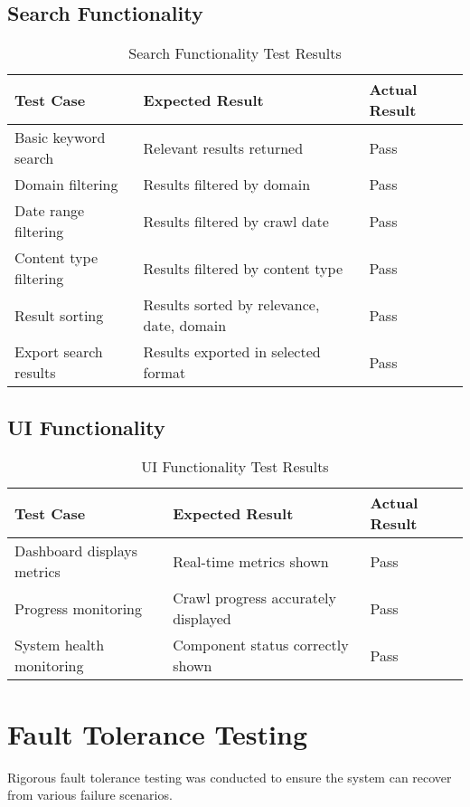 \documentclass[12pt,a4paper]{report}
\begin{document}
\subsection{Search Functionality}
\begin{table}[H]
    \centering
    \begin{tabularx}{\textwidth}{|X|X|X|}
        \hline
        \textbf{Test Case} & \textbf{Expected Result} & \textbf{Actual Result} \\
        \hline
        Basic keyword search & Relevant results returned & Pass \\
        \hline
        Domain filtering & Results filtered by domain & Pass \\
        \hline
        Date range filtering & Results filtered by crawl date & Pass \\
        \hline
        Content type filtering & Results filtered by content type & Pass \\
        \hline
        Result sorting & Results sorted by relevance, date, domain & Pass \\
        \hline
        Export search results & Results exported in selected format & Pass \\
        \hline
    \end{tabularx}
    \caption{Search Functionality Test Results}
\end{table}

\subsection{UI Functionality}
\begin{table}[H]
    \centering
    \begin{tabularx}{\textwidth}{|X|X|X|}
        \hline
        \textbf{Test Case} & \textbf{Expected Result} & \textbf{Actual Result} \\
        \hline
        Dashboard displays metrics & Real-time metrics shown & Pass \\
        \hline
        Progress monitoring & Crawl progress accurately displayed & Pass \\
        \hline
        System health monitoring & Component status correctly shown & Pass \\
        \hline
    \end{tabularx}
    \caption{UI Functionality Test Results}
\end{table}

\section{Fault Tolerance Testing}
Rigorous fault tolerance testing was conducted to ensure the system can recover from various failure scenarios.
\end{document}
